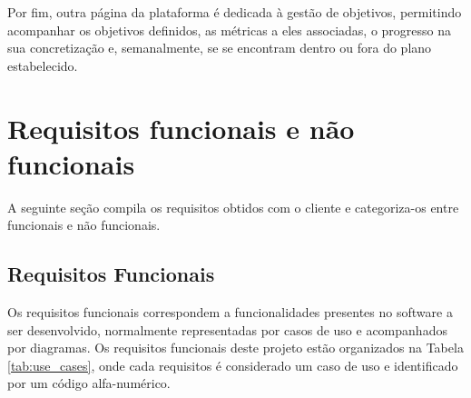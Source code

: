 Por fim, outra página da plataforma é dedicada à gestão de objetivos, permitindo acompanhar os objetivos definidos, as métricas a eles associadas, o progresso na sua concretização e, semanalmente, se se encontram dentro ou fora do plano estabelecido.

\section{Requisitos funcionais e não funcionais}

A seguinte seção compila os requisitos obtidos com o cliente e categoriza-os entre funcionais e não funcionais.

\subsection{Requisitos Funcionais}

Os requisitos funcionais correspondem a funcionalidades presentes no software a ser desenvolvido, normalmente representadas por casos de uso e acompanhados por diagramas. Os requisitos funcionais deste projeto estão organizados na Tabela \ref{tab:use_cases}, onde cada requisitos é considerado um caso de uso e identificado por um código alfa-numérico.

